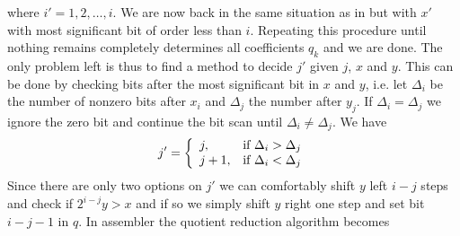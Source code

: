 where $i'=1,2,\dots,i$.
We are now back in the same situation as in  but with $x'$ with most significant bit of order less than $i$. Repeating this procedure until nothing remains completely determines all coefficients $q_k$ and we are done.
The only problem left is thus to find a method to decide $j'$ given $j$, $x$ and $y$. This can be done by checking bits after the most significant bit in $x$ and $y$, i.e. let $\Delta_i$ be the number of nonzero bits after $x_i$ and $\Delta_j$ the number after $y_j$. If $\Delta_i=\Delta_j$ we ignore the zero bit and continue the bit scan until $\Delta_i\ne\Delta_j$. 
We have
\begin{align}
j'=\left\{\begin{array}{ll}
j, & \mbox{if $\Delta_i>\Delta_j$}\cr
j+1, & \mbox{if $\Delta_i<\Delta_j$}\cr
\end{array}\right.
\end{align}
Since there are only two options on $j'$ we can comfortably shift $y$ left $i-j$ steps and check if $2^{i-j}y>x$ and if so we simply shift $y$ right one step and set bit $i-j-1$ in $q$. 
In assembler the quotient reduction algorithm becomes 
